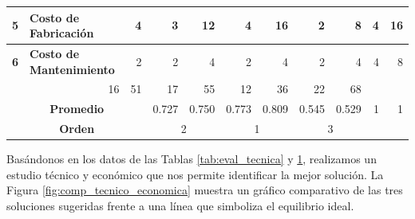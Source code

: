 \begin{table}[H]
\begin{tabular}{|c|c|c|c|c|c|c|c|c|c|c|}
		\hline
		\textbf{5} & \multicolumn{1}{l|}{\textbf{Costo de Fabricación}} & \multicolumn{1}{r|}{4} & \multicolumn{1}{r|}{\cellcolor[rgb]{ .949,  .863,  .859}3} & \multicolumn{1}{r|}{12} & \multicolumn{1}{r|}{\cellcolor[rgb]{ .863,  .902,  .945}4} & \multicolumn{1}{r|}{16} & \multicolumn{1}{r|}{\cellcolor[rgb]{ .922,  .945,  .871}2} & \multicolumn{1}{r|}{8} & \multicolumn{1}{r|}{\cellcolor[rgb]{ .992,  .914,  .851}4} & \multicolumn{1}{r|}{16} \bigstrut\\
		\hline
		\textbf{6} & \multicolumn{1}{l|}{\textbf{Costo de Mantenimiento}} & \multicolumn{1}{r|}{2} & \multicolumn{1}{r|}{\cellcolor[rgb]{ .949,  .863,  .859}2} & \multicolumn{1}{r|}{4} & \multicolumn{1}{r|}{\cellcolor[rgb]{ .863,  .902,  .945}2} & \multicolumn{1}{r|}{4} & \multicolumn{1}{r|}{\cellcolor[rgb]{ .922,  .945,  .871}2} & \multicolumn{1}{r|}{4} & \multicolumn{1}{r|}{\cellcolor[rgb]{ .992,  .914,  .851}4} & \multicolumn{1}{r|}{8} \bigstrut\\
		\hline
		\rowcolor[rgb]{ .851,  .851,  .851} \multicolumn{3}{|c|}{\textbf{Suma}} & \multicolumn{1}{r|}{16} & \multicolumn{1}{r|}{51} & \multicolumn{1}{r|}{17} & \multicolumn{1}{r|}{55} & \multicolumn{1}{r|}{12} & \multicolumn{1}{r|}{36} & \multicolumn{1}{r|}{22} & \multicolumn{1}{r|}{68} \bigstrut\\
		\hline
		\multicolumn{3}{|c|}{\textbf{Promedio}} & \multicolumn{1}{r|}{0.727} & \multicolumn{1}{r|}{\cellcolor[rgb]{ 1,  1,  0}0.750} & \multicolumn{1}{r|}{0.773} & \multicolumn{1}{r|}{\cellcolor[rgb]{ 1,  1,  0}0.809} & \multicolumn{1}{r|}{0.545} & \multicolumn{1}{r|}{\cellcolor[rgb]{ 1,  1,  0}0.529} & \multicolumn{1}{r|}{1} & \multicolumn{1}{r|}{\cellcolor[rgb]{ 1,  1,  0}1} \bigstrut\\
		\hline
		\multicolumn{3}{|c|}{\textbf{Orden}} & \multicolumn{2}{c|}{2} & \multicolumn{2}{c|}{1} & \multicolumn{2}{c|}{3} & \multicolumn{2}{c|}{} \bigstrut\\
		\hline
	\end{tabular}%
	\label{tab:eval_economica}%
\end{table}%


Basándonos en los datos de las Tablas \ref{tab:eval_tecnica} y \ref{tab:eval_economica}, realizamos un estudio técnico y económico que nos permite identificar la mejor solución. La Figura \ref{fig:comp_tecnico_economica} muestra un gráfico comparativo de las tres soluciones sugeridas frente a una línea que simboliza el equilibrio ideal.

